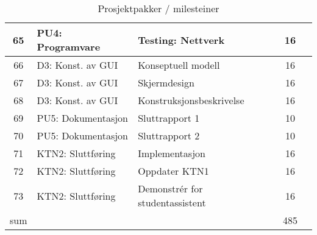 \begin{table}
{\begin{tabularx}{1.3\textwidth}{|c|l|X|c|c|}
	65 & PU4: Programvare & Testing: Nettverk & 16 & \\ \hline
	66 & D3: Konst. av GUI & Konseptuell modell & 16 & \\ \hline
	67 & D3: Konst. av GUI & Skjermdesign & 16 & \\ \hline
	68 & D3: Konst. av GUI & Konstruksjonsbeskrivelse & 16 & \\ \hline
	69 & PU5: Dokumentasjon & Sluttrapport  1& 10 & \\ \hline
	70 & PU5: Dokumentasjon & Sluttrapport  2& 10 & \\ \hline
	71 & KTN2: Sluttføring & Implementasjon & 16 & \\ \hline
	72 & KTN2: Sluttføring & Oppdater KTN1 & 16 & \\ \hline
	73 & KTN2: Sluttføring & Demonstrér for studentassistent & 16 & \\ \hline
	sum & & & 485 & \\ \hline \hline
	\end{tabularx}}
\caption {Prosjektpakker / milesteiner}
\end{table}

